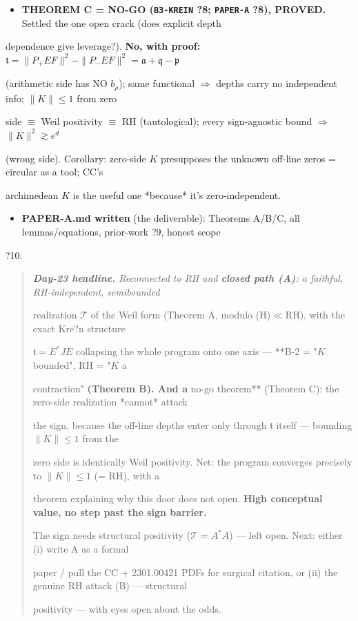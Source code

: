 \documentclass[10pt]{article}
\begin{document}
\begin{itemize}
\item \textbf{THEOREM C = NO-GO (\texttt{B3-KREIN} ?8; \texttt{PAPER-A} ?8), PROVED.} Settled the one open crack (does explicit depth
\end{itemize}
  dependence give leverage?). \textbf{No, with proof:} $\mathfrak t=\|P_+EF\|^2-\|P_-EF\|^2=\mathfrak a+\mathfrak q-\mathfrak p$\par
  (arithmetic side has NO $b_\rho$); same functional \ensuremath{\Rightarrow} depths carry no independent info; $\|K\|\le1$ from zero\par
  side $\equiv$ Weil positivity $\equiv$ RH (tautological); every sign-agnostic bound \ensuremath{\Rightarrow} $\|K\|^2\gtrsim e^d$\par
  (wrong side). Corollary: zero-side $K$ presupposes the unknown off-line zeros = circular as a tool; CC's\par
  archimedean $K$ is the useful one *because* it's zero-independent.\par

\begin{itemize}
\item \textbf{PAPER-A.md written} (the deliverable): Theorems A/B/C, all lemmas/equations, prior-work ?9, honest scope
\end{itemize}
  ?10.\par

\begin{quote}\itshape
\textbf{Day-23 headline.} Reconnected to RH and \textbf{closed path (A)}: a faithful, RH-independent, semibounded\par
realization $\mathcal T$ of the Weil form (Theorem A, modulo (H)\ensuremath{\ll}RH), with the exact Kre?n structure\par
$\mathfrak t=E^*JE$ collapsing the whole program onto one axis --- **B-2 = "$K$ bounded", RH = "$K$ a\par
contraction"\textbf{ (Theorem B). And a }no-go theorem** (Theorem C): the zero-side realization *cannot* attack\par
the sign, because the off-line depths enter only through $\mathfrak t$ itself --- bounding $\|K\|\le1$ from the\par
zero side is identically Weil positivity. Net: the program converges precisely to $\|K\|\le1$ (= RH), with a\par
theorem explaining why this door does not open. \textbf{High conceptual value, no step past the sign barrier.}\par
The sign needs structural positivity ($\mathcal T=A^*A$) --- left open. Next: either (i) write A as a formal\par
paper / pull the CC + 2301.00421 PDFs for surgical citation, or (ii) the genuine RH attack (B) --- structural\par
positivity --- with eyes open about the odds.\par
\end{quote}
\end{document}
